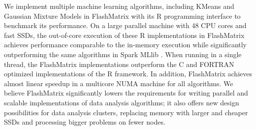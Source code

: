 
We implement multiple machine learning algorithms, including KMeans \cite{kmeans}
and Gaussian Mixture Models \cite{gmm} in FlashMatrix with its R programming
interface to benchmark its performance. On a large parallel machine with 48
CPU cores and fast SSDs, the out-of-core execution of these R implementations
in FlashMatrix achieves performance comparable to the in-memory execution
while significantly outperforming the same algorithms in Spark MLlib \cite{spark}.
When running in a single thread, the FlashMatrix implementations outperform the C and
FORTRAN optimized implementations of the R framework. In addition, FlashMatrix achieves
almost linear speedup in a multicore NUMA machine for all algorithms.
We believe FlashMatrix significantly lowers the requirements for writing parallel
and scalable implementations of data analysis algorithms; it also offers new
design possibilities for data analysis clusters, replacing memory with larger
and cheaper SSDs and processing bigger problems on fewer nodes.
